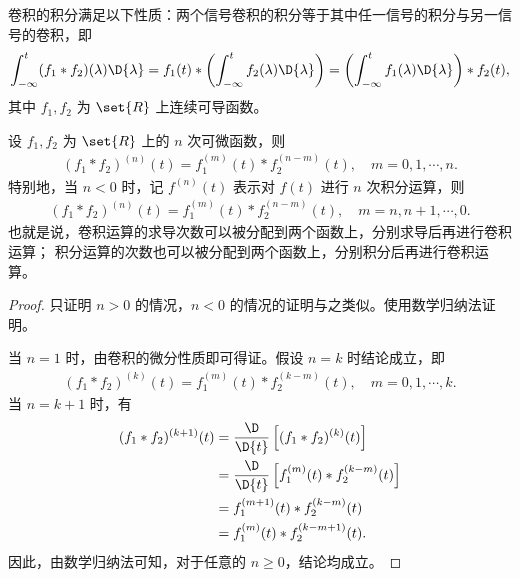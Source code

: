 \begin{property}[卷积的积分性质]
    \label{property:convolution-integral}
    卷积的积分满足以下性质：两个信号卷积的积分等于其中任一信号的积分与另一信号的卷积，即
    \begin{align*}
        \int_{-\infty}^{t}(f_1 * f_2)(\lambda)\D{\lambda}
        = f_1(t) * \left(\int_{-\infty}^{t}f_2(\lambda)\D{\lambda}\right)
        = \left(\int_{-\infty}^{t}f_1(\lambda)\D{\lambda}\right) * f_2(t),
    \end{align*}
    其中 $f_1, f_2$ 为  $\set{R}$ 上连续可导函数。
\end{property}

\begin{corollary}
    设 $f_1, f_2$ 为 $\set{R}$ 上的 $n$ 次可微函数，则
    \begin{align*}
        (f_1 * f_2)^{(n)}(t) = f_1^{(m)}(t) * f_2^{(n - m)}(t), \quad m = 0, 1, \cdots, n.
    \end{align*}
    特别地，当 $n < 0$ 时，记 $f^{(n)}(t)$ 表示对 $f(t)$ 进行 $n$ 次积分运算，则
    \begin{align*}
        (f_1 * f_2)^{(n)}(t) = f_1^{(m)}(t) * f_2^{(n - m)}(t), \quad m = n, n + 1, \cdots, 0.
    \end{align*}
    也就是说，卷积运算的求导次数可以被分配到两个函数上，分别求导后再进行卷积运算；
    积分运算的次数也可以被分配到两个函数上，分别积分后再进行卷积运算。
\end{corollary}

\begin{proof}
    只证明 $n > 0$ 的情况，$n < 0$ 的情况的证明与之类似。使用数学归纳法证明。
    
    当 $n = 1$ 时，由卷积的微分性质即可得证。假设 $n = k$ 时结论成立，即
    \begin{align*}
        (f_1 * f_2)^{(k)}(t) = f_1^{(m)}(t) * f_2^{(k - m)}(t), \quad m = 0, 1, \cdots, k.
    \end{align*}
    当 $n = k + 1$ 时，有
    \begin{align*}
        (f_1 * f_2)^{(k + 1)}(t) & = \frac{\D}{\D{t}}\left[(f_1 * f_2)^{(k)}(t)\right] \\
        & = \frac{\D}{\D{t}}\left[f_1^{(m)}(t) * f_2^{(k - m)}(t)\right] \\
        & = f_1^{(m + 1)}(t) * f_2^{(k - m)}(t) \\
        & = f_1^{(m)}(t) * f_2^{(k - m + 1)}(t).
    \end{align*}
    因此，由数学归纳法可知，对于任意的 $n \ge 0$，结论均成立。
\end{proof}

